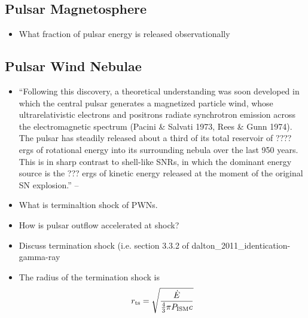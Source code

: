 \subsection{Pulsar Magnetosphere}

\begin{itemize}
  \item What fraction of pulsar energy is released observationally
\end{itemize}

\subsection{Pulsar Wind Nebulae}

\begin{itemize}
  \item ``Following this discovery, a theoretical understanding was
  soon developed in which the central pulsar generates a magnetized
  particle wind, whose ultrarelativistic electrons and positrons radiate
  synchrotron emission across the electromagnetic spectrum (Pacini \&
  Salvati 1973, Rees \& Gunn 1974). The pulsar has steadily released
  about a third of its total reservoir of ???? ergs
  of rotational energy into its surrounding nebula over the last 950
  years. This is in sharp contrast to shell-like SNRs, in which the
  dominant energy source is the ??? ergs of kinetic energy
  released at the moment of the original SN explosion.''  -- \cite{gaensler_2006_evolution-structure}
  \item 
    What is terminaltion shock of \glspl{PWN}.
  \item 
    How is pulsar outflow accelerated at shock?
\end{itemize}



\begin{itemize}
  \item Discuss termination shock (i.e. section 3.3.2 of dalton\_2011\_identication-gamma-ray
  \item The radius of the termination shock is
    \begin{equation}
      r_\text{ts} = \sqrt{\frac{\dot{E}}{\tfrac{4}{3}\pi P_\text{ISM} c}}
    \end{equation}

\end{itemize}



